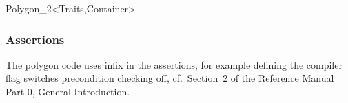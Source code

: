 \begin{ccClassTemplate}{Polygon_2<Traits,Container>}
\subsubsection*{Assertions}
The polygon code uses infix  in the assertions,
for example defining the compiler flag
 switches precondition
checking off, cf.~Section~2 of the Reference Manual Part 0, General 
Introduction.








\ccThreeToTwo
{}
\ccGlue
{}

\ccGlue
{}
\ccGlue
{}


\end{ccClassTemplate}
